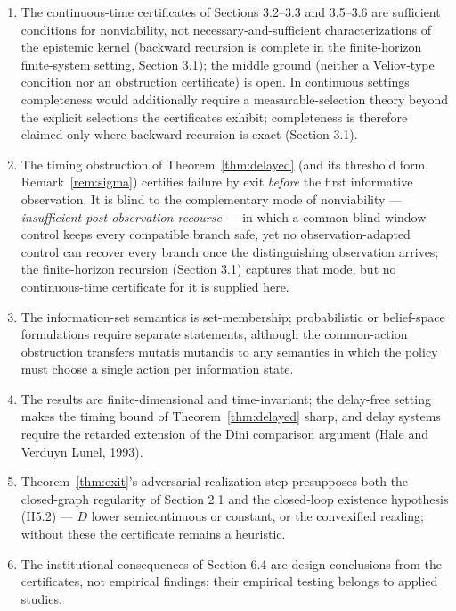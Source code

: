 \documentclass[10pt,twocolumn]{article}
\theoremstyle{definition}
\providecommand{\tightlist}{\setlength{\itemsep}{0pt}\setlength{\parskip}{0pt}}
\begin{document}
\begin{enumerate}
\def\labelenumi{(\roman{enumi})}
\tightlist
\item
  The continuous-time certificates of Sections 3.2--3.3 and 3.5--3.6 are sufficient conditions for nonviability, not necessary-and-sufficient characterizations of the epistemic kernel (backward recursion is complete in the finite-horizon finite-system setting, Section 3.1); the middle ground (neither a Veliov-type condition nor an obstruction certificate) is open. In
continuous settings completeness would additionally require a
measurable-selection theory beyond the explicit selections the
certificates exhibit; completeness is therefore claimed only where
backward recursion is exact (Section 3.1).
\item
  The timing obstruction of Theorem~\ref{thm:delayed} (and its threshold form, Remark~\ref{rem:sigma}) certifies failure by exit \emph{before} the first informative observation. It is blind to the complementary mode of nonviability --- \emph{insufficient post-observation recourse} --- in which a common blind-window control keeps every compatible branch safe, yet no observation-adapted control can recover every branch once the distinguishing observation arrives; the finite-horizon recursion (Section 3.1) captures that mode, but no continuous-time certificate for it is supplied here.
\item
  The information-set semantics is set-membership; probabilistic or belief-space formulations require separate statements, although the common-action obstruction transfers mutatis mutandis to any semantics in which the policy must choose a single action per information state.
\item
  The results are finite-dimensional and time-invariant; the delay-free setting makes the timing bound of Theorem~\ref{thm:delayed} sharp, and delay systems require the retarded extension of the Dini comparison argument (Hale and Verduyn Lunel, 1993).
\item
  Theorem~\ref{thm:exit}'s adversarial-realization step presupposes both the closed-graph regularity of Section 2.1 and the closed-loop existence hypothesis (H5.2) --- \(D\) lower semicontinuous or constant, or the convexified reading; without these the certificate remains a heuristic.
\item
  The institutional consequences of Section 6.4 are design conclusions from the certificates, not empirical findings; their empirical testing belongs to applied studies.
\end{enumerate}
\end{document}

